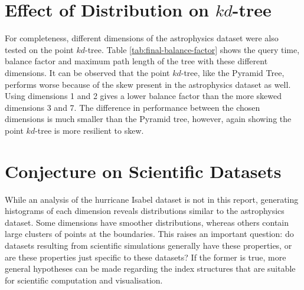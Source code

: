 \section{Effect of Distribution on $kd$-tree}

For completeness, different dimensions of the astrophysics dataset were also tested on the point $kd$-tree. Table \ref{tab:final-balance-factor} shows the query time, balance factor and maximum path length of the tree with these different dimensions. It can be observed that the point $kd$-tree, like the Pyramid Tree, performs worse because of the skew present in the astrophysics dataset as well. Using dimensions 1 and 2 gives a lower balance factor than the more skewed dimensions 3 and 7. The difference in performance between the chosen dimensions is much smaller than the Pyramid tree, however, again showing the point $kd$-tree is more resilient to skew.

\begin{table}
	\centering
	\caption{Point $kd$-tree Statistics with Different Dimensions of Astrophysics Dataset}
	\label{tab:final-balance-factor}
\end{table}

\section{Conjecture on Scientific Datasets}

While an analysis of the hurricane Isabel dataset is not in this report, generating histograms of each dimension reveals distributions similar to the astrophysics dataset. Some dimensions have smoother distributions, whereas others contain large clusters of points at the boundaries. This raises an important question: do datasets resulting from scientific simulations generally have these properties, or are these properties just specific to these datasets? If the former is true, more general hypotheses can be made regarding the index structures that are suitable for scientific computation and visualisation.


